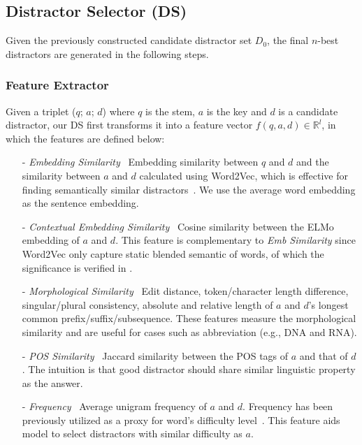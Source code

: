 \subsection{Distractor Selector (DS)}
\label{sec:DS}
Given the previously constructed candidate distractor set $D_0$, the final $n$-best distractors are generated in the following steps.
\subsubsection{Feature Extractor}
\label{sec:FE}
Given a triplet ($q$; $a$; $d$) where $q$ is the stem, $a$ is the key and $d$ is a candidate distractor, 
our DS first transforms it into a feature vector $f(q,a,d)\in \mathbb{R}^l$, in which the features are defined below:
\begin{itemize}
	\item[-] \textit{Embedding Similarity} ~Embedding similarity between $q$ and $d$ and the similarity between $a$ and $d$ calculated using Word2Vec, which is effective for finding semantically similar distractors~\cite{guo2016questimator}. We use the average word embedding as the sentence embedding. 
	\item[-] \textit{Contextual Embedding Similarity} ~Cosine similarity between the ELMo~\cite{peters2018deep} embedding of $a$ and $d$. This feature is complementary to \textit{Emb Similarity} since Word2Vec only capture static blended semantic of words, of which the significance is verified in .
	\item[-] \textit{Morphological Similarity} ~Edit distance, token/character length difference, singular/plural consistency, absolute and relative length of $a$ and $d$'s longest common prefix/suffix/subsequence. These features measure the morphological similarity and are useful for cases such as abbreviation 
(e.g., DNA and RNA). 
	\item[-] \textit{POS Similarity} ~Jaccard similarity between the 
POS tags of $a$ and that of $d$. The intuition is that good distractor 
should share similar linguistic property as the answer.
	\item[-] \textit{Frequency} ~Average unigram frequency of $a$ and $d$. Frequency has been previously utilized as a proxy for word's difficulty level~\cite{article}. This feature aids model to select distractors with similar difficulty as $a$.

\end{itemize}
